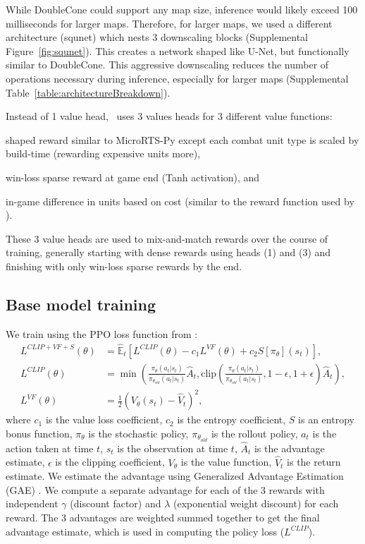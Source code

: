 \documentclass[conference]{IEEEtran}
\begin{document}
While DoubleCone could support any map size, inference would likely exceed 100
milliseconds for larger maps. Therefore, for larger maps, we used a different
architecture (squnet) which nests 3 downscaling blocks (Supplemental Figure~\ref{fig:squnet}). This 
creates a network shaped like U-Net, but functionally similar to DoubleCone.
This aggressive downscaling reduces the number of operations necessary during inference,
especially for larger maps (Supplemental Table~\ref{table:architectureBreakdown}).

Instead of 1 value head, \agentName\ uses 3 values heads for 3 different value
functions:
\begin{inparaenum}[(1)]
    \item shaped reward similar to MicroRTS-Py except each combat unit type is
    scaled by build-time (rewarding expensive units more),
    \item win-loss sparse reward at game end (Tanh activation), and
    \item in-game difference in units based on cost (similar to the reward function used
    by \cite{Winter2021}).
\end{inparaenum}
These 3 value heads are used to mix-and-match rewards over the course of training,
generally starting with dense rewards using heads (1) and (3) and finishing with only
win-loss sparse rewards by the end.

\subsection{Base model training}
We train using the PPO loss function from \cite{DBLP:journals/corr/SchulmanWDRK17}:
\begin{align}
    L^{CLIP+VF+S}(\theta) &= \hat{\mathbb{E}}_t \left[ L^{CLIP}(\theta) - c_1 L^{VF}(\theta) + c_2 S\left[\pi_\theta\right](s_t) \right], \\
    L^{CLIP}(\theta) &= \min \left( \frac{\pi_\theta(a_t|s_t)}{\pi_{\theta_{old}}(a_t|s_t)} \hat{A}_t, \text{clip}\left( \frac{\pi_\theta(a_t|s_t)}{\pi_{\theta_{old}}(a_t|s_t)}, 1-\epsilon, 1+\epsilon \right) \hat{A}_t \right), \\
    L^{VF}(\theta) &= \frac{1}{2} \left( V_\theta(s_t) - \hat{V}_t \right)^2,
\end{align}
where $c_1$ is the value loss coefficient, $c_2$ is the entropy coefficient, $S$ is an
entropy bonus function, $\pi_\theta$ is the stochastic policy, $\pi_{\theta_{old}}$ is the rollout policy, $a_t$
is the action taken at time $t$, $s_t$ is the observation at time $t$, $\hat{A}_t$
is the advantage estimate,  $\epsilon$ is the clipping coefficient, $V_\theta$ is the
value function, $\hat{V}_t$ is the return estimate. We estimate the advantage
using Generalized Advantage Estimation (GAE) \cite{DBLP:journals/corr/SchulmanMLJA15}.
We compute a separate advantage for each of the 3 rewards with independent $\gamma$
(discount factor) and $\lambda$ (exponential weight discount) for each reward. The 3 
advantages are weighted summed together to get the final advantage estimate, which is
used in computing the policy loss ($L^{CLIP}$).
\end{document}
